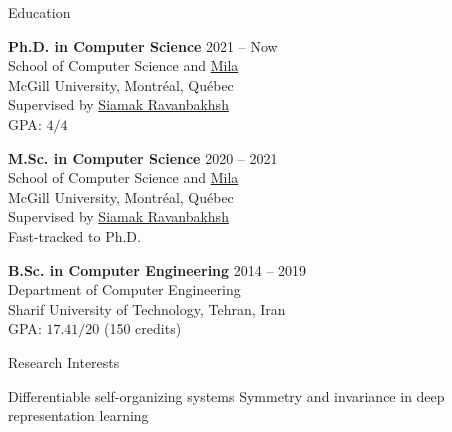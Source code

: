 \documentclass{resume}
\newcommand{\InternalSpace}{\vspace{0.18cm}}
\newenvironment{MySection}[1]
{\begin{category}{#1}}
{\end{category}}
\newcommand{\MyItem}{\citembullet}
\def \Siamak {\href{https://scholar.google.com/citations?user=VciG3C8AAAAJ}{Siamak Ravanbakhsh}}
\begin{document}
\maketitle

\vspace{-0.75cm}

\InternalSpace
\InternalSpace



\begin{MySection}{Education}

\MyItem
\textbf{Ph.D. in Computer Science} \hfill{ 2021 -- Now }\\
School of Computer Science and \href{https://mila.quebec/en/}{Mila}\\
McGill University, Montréal, Québec\\
Supervised by \Siamak\\
\textsc{GPA}: $4/4$

\MyItem
\textbf{M.Sc. in Computer Science} \hfill{ 2020 -- 2021 }\\
School of Computer Science and \href{https://mila.quebec/en/}{Mila}\\
McGill University, Montréal, Québec\\
Supervised by \Siamak\\
Fast-tracked to Ph.D.

\MyItem
\textbf{B.Sc. in Computer Engineering} \hfill{ 2014 -- 2019 }\\
Department of Computer Engineering\\
Sharif University of Technology, Tehran, Iran\\
\textsc{GPA}: $17.41/20$ (150 credits)\\

\end{MySection}

\InternalSpace



\begin{MySection}{Research Interests}


\MyItem Differentiable self-organizing systems
\MyItem Symmetry and invariance in deep representation learning

\end{MySection}
\end{document}
